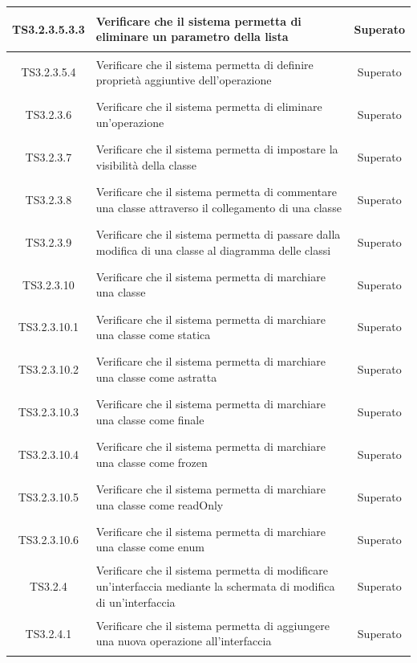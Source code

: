 \documentclass[../PianoDiQualifica.tex]{subfiles}
\begin{document}
\begin{longtable}{|c|>{\centering}p{10cm}|c|}
	\hline
	\hypertarget{TS3.2.3.5.3.3}{TS3.2.3.5.3.3} & Verificare che il sistema permetta di eliminare un parametro della lista & Superato \\
	\hline
	\hypertarget{TS3.2.3.5.4}{TS3.2.3.5.4} & Verificare che il sistema permetta di definire proprietà aggiuntive dell'operazione & Superato\\
	\hline
	\hypertarget{TS3.2.3.6}{TS3.2.3.6} & Verificare che il sistema permetta di eliminare un'operazione & Superato \\
	\hline
	\hypertarget{TS3.2.3.7}{TS3.2.3.7} & Verificare che il sistema permetta di impostare la visibilità della classe & Superato \\
	\hline
	\hypertarget{TS3.2.3.8}{TS3.2.3.8} & Verificare che il sistema permetta di commentare una classe attraverso il collegamento di una classe & Superato \\
	\hline
	\hypertarget{TS3.2.3.9}{TS3.2.3.9} & Verificare che il sistema permetta di passare dalla modifica di una classe al diagramma delle classi & Superato \\
	\hline
	\hypertarget{TS3.2.3.10}{TS3.2.3.10} & Verificare che il sistema permetta di marchiare una classe & Superato\\
	\hline
	\hypertarget{TS3.2.3.10.1}{TS3.2.3.10.1} & Verificare che il sistema permetta di marchiare una classe come statica & Superato \\
	\hline
	\hypertarget{TS3.2.3.10.2}{TS3.2.3.10.2} & Verificare che il sistema permetta di marchiare una classe come astratta & Superato\\
	\hline
	\hypertarget{TS3.2.3.10.3}{TS3.2.3.10.3} & Verificare che il sistema permetta di marchiare una classe come finale & Superato\\
	\hline
	\hypertarget{TS3.2.3.10.4}{TS3.2.3.10.4} & Verificare che il sistema permetta di marchiare una classe come frozen & Superato \\
	\hline
	\hypertarget{TS3.2.3.10.5}{TS3.2.3.10.5} & Verificare che il sistema permetta di marchiare una classe come readOnly & Superato \\
	\hline
	\hypertarget{TS3.2.3.10.6}{TS3.2.3.10.6} & Verificare che il sistema permetta di marchiare una classe come enum & Superato \\
	\hline
	\hypertarget{TS3.2.4}{TS3.2.4} & Verificare che il sistema permetta di modificare un'interfaccia mediante la schermata di modifica di un'interfaccia & Superato \\
	\hline
	\hypertarget{TS3.2.4.1}{TS3.2.4.1} & Verificare che il sistema permetta di aggiungere una nuova operazione all'interfaccia & Superato\\

\end{longtable}
\end{document}
